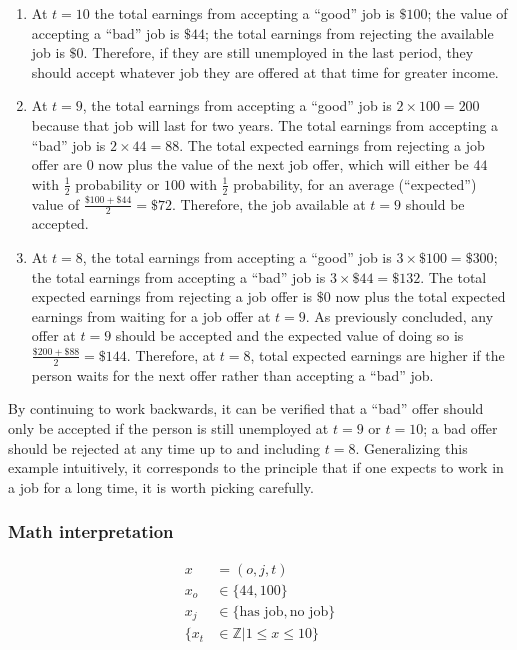 \documentclass[a4paper, 12pt]{article}
\begin{document}
\begin{enumerate}
  \item At $t = 10$ the total earnings from accepting a ``good''
    job is $\$100$; the value of accepting a ``bad'' job is
    $\$44$; the total earnings from rejecting the available job is
    $\$0$. Therefore, if they are still unemployed in the last
    period, they should accept whatever job they are offered at
    that time for greater income.
  \item At $t = 9$, the total earnings from accepting a ``good''
    job is $2 \times 100 = 200$ because that job will last for two
    years. The total earnings from accepting a ``bad'' job is $2
    \times 44 = 88$. The total expected earnings from rejecting a
    job offer are $0$ now plus the value of the next job offer,
    which will either be $44$ with $\frac{1}{2}$ probability or
    $100$ with $\frac{1}{2}$ probability, for an average
    (``expected'') value of $\frac {\$100+\$44}{2}=\$72$.
    Therefore, the job available at $t=9$ should be accepted.
  \item At $t=8$, the total earnings from accepting a ``good'' job
    is $3\times \$100=\$300$; the total earnings from accepting a
    ``bad'' job is $3\times \$44=\$132$. The total expected
    earnings from rejecting a job offer is $\$0$ now plus the
    total expected earnings from waiting for a job offer at $t=9$.
    As previously concluded, any offer at $t=9$ should be accepted
    and the expected value of doing so is ${\frac
    {\$200+\$88}{2}}=\$144$. Therefore, at $t=8$, total expected
    earnings are higher if the person waits for the next offer
    rather than accepting a ``bad'' job.
\end{enumerate}

By continuing to work backwards, it can be verified that a ``bad''
offer should only be accepted if the person is still unemployed at
$t=9$ or $t=10$; a bad offer should be rejected at any time up to
and including $t=8$. Generalizing this example intuitively, it
corresponds to the principle that if one expects to work in a job
for a long time, it is worth picking carefully.

\subsubsection{Math interpretation}

\[
\begin{aligned}
  x &= (o, j, t) \\
  x_{o} &\in \{44, 100\} \\
  x_{j} &\in \{\text{has job}, \text{no job}\} \\
  \{x_{t} &\in \mathbb{Z} | 1 \leq x \leq 10\}
\end{aligned}
\]
\end{document}
